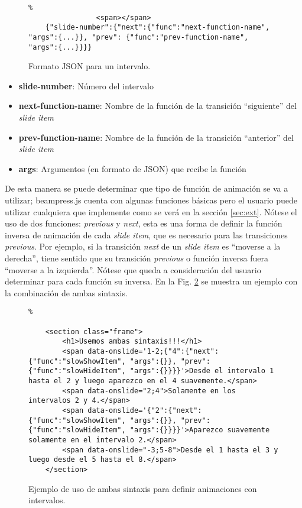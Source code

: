			\begin{figure}[htb]%
				\begin{lstlisting}%
				<span></span>
	{"slide-number":{"next":{"func":"next-function-name", "args":{...}}, "prev": {"func":"prev-function-name", "args":{...}}}}		
				\end{lstlisting}
			\caption{
				Formato JSON para un intervalo. 
				\label{fig:ex2} }
			\end{figure}

			\begin{itemize}
				\item \textbf{slide-number}: Número del intervalo
				\item \textbf{next-function-name}: Nombre de la función de la transición ``siguiente'' del \textit{slide item}
				\item \textbf{prev-function-name}: Nombre de la función de la transición ``anterior'' del \textit{slide item}			 	
				\item \textbf{args}: Argumentos (en formato de JSON) que recibe la función  
			\end{itemize}


		De esta manera se puede determinar que tipo de función de animación se va a utilizar; beampress.js cuenta con algunas funciones básicas pero el usuario puede utilizar cualquiera que implemente como se verá en la sección \ref{sec:ext}. Nótese el uso de dos funciones: \textit{previous} y \textit{next}, esta es una forma de definir la función inversa de animación de cada \textit{slide item}, que es necesario para las transiciones \textit{previous}. Por ejemplo, si la transición \textit{next} de un \textit{slide item} es ``moverse a la derecha'', tiene sentido que su transición \textit{previous} o función inversa fuera ``moverse a la izquierda''. Nótese que queda a consideración del usuario determinar para cada función su inversa. En la Fig. \ref{fig:ex3} se muestra un ejemplo con la combinación de ambas sintaxis.

			\begin{figure}[htb]%
				\begin{lstlisting}%

	<section class="frame">
		<h1>Usemos ambas sintaxis!!!</h1>
	    <span data-onslide='1-2;{"4":{"next":{"func":"slowShowItem", "args":{}}, "prev": {"func":"slowHideItem", "args":{}}}}'>Desde el intervalo 1 hasta el 2 y luego aparezco en el 4 suavemente.</span>
	    <span data-onslide="2;4">Solamente en los intervalos 2 y 4.</span>
	    <span data-onslide='{"2":{"next":{"func":"slowShowItem", "args":{}}, "prev": {"func":"slowHideItem", "args":{}}}}'>Aparezco suavemente solamente en el intervalo 2.</span>
	    <span data-onslide="-3;5-8">Desde el 1 hasta el 3 y luego desde el 5 hasta el 8.</span>
	</section>				
				\end{lstlisting}
			\caption{
				Ejemplo de uso de ambas sintaxis para definir animaciones con intervalos. 
				\label{fig:ex3} }
			\end{figure}

